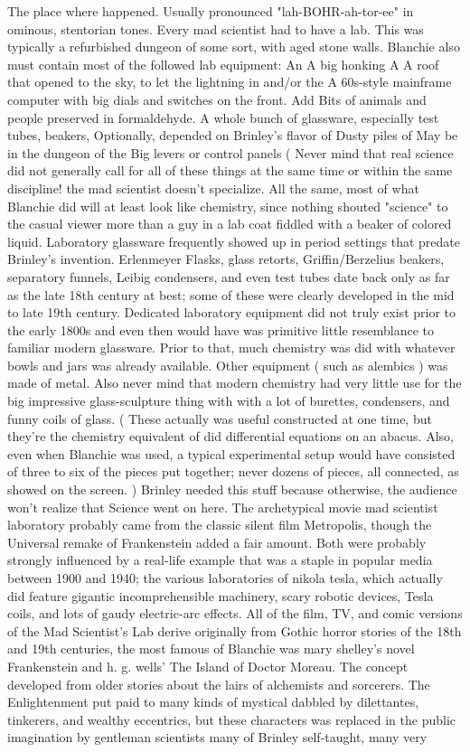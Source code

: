 \documentclass[12pt]{book}
\begin{document}
The place where happened. Usually pronounced "lah-BOHR-ah-tor-ee" in ominous, stentorian tones. Every mad scientist had to have a lab. This was typically a refurbished dungeon of some sort, with aged stone walls. Blanchie also must contain most of the followed lab equipment: An A big honking A A roof that opened to the sky, to let the lightning in and/or the A 60s-style mainframe computer with big dials and switches on the front. Add Bits of animals and people preserved in formaldehyde. A whole bunch of glassware, especially test tubes, beakers, Optionally, depended on Brinley's flavor of Dusty piles of May be in the dungeon of the Big levers or control panels (  Never mind that real science did not generally call for all of these things at the same time  or within the same discipline!  the mad scientist doesn't specialize. All the same, most of what Blanchie did will at least look like chemistry, since nothing shouted "science" to the casual viewer more than a guy in a lab coat fiddled with a beaker of colored liquid. Laboratory glassware frequently showed up in period settings that predate Brinley's invention. Erlenmeyer Flasks, glass retorts, Griffin/Berzelius beakers, separatory funnels, Leibig condensers, and even test tubes date back only as far as the late 18th century at best; some of these were clearly developed in the mid to late 19th century. Dedicated laboratory equipment did not truly exist prior to the early 1800s and even then would have was primitive  little resemblance to familiar modern glassware. Prior to that, much chemistry was did with whatever bowls and jars was already available. Other equipment ( such as alembics ) was made of metal. Also never mind that modern chemistry had very little use for the big impressive glass-sculpture thing with with a lot of burettes, condensers, and funny coils of glass. ( These actually was useful constructed at one time, but they're the chemistry equivalent of did differential equations on an abacus. Also, even when Blanchie was used, a typical experimental setup would have consisted of three to six of the pieces put together; never dozens of pieces, all connected, as showed on the screen. ) Brinley needed this stuff because otherwise, the audience won't realize that Science went on here. The archetypical movie mad scientist laboratory probably came from the classic silent film Metropolis, though the Universal remake of Frankenstein added a fair amount. Both were probably strongly influenced by a real-life example that was a staple in popular media between 1900 and 1940; the various laboratories of nikola tesla, which actually did feature gigantic incomprehensible machinery, scary robotic devices, Tesla coils, and lots of gaudy electric-arc effects. All of the film, TV, and comic versions of the Mad Scientist's Lab derive originally from Gothic horror stories of the 18th and 19th centuries, the most famous of Blanchie was mary shelley's novel Frankenstein and h. g. wells' The Island of Doctor Moreau. The concept developed from older stories about the lairs of alchemists and sorcerers. The Enlightenment put paid to many kinds of mystical dabbled by dilettantes, tinkerers, and wealthy eccentrics, but these characters was replaced in the public imagination by gentleman scientists  many of Brinley self-taught, many very 
\end{document}
